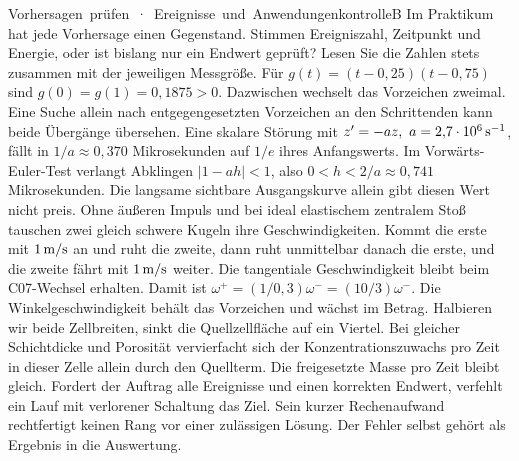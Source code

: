 \unit{Vorhersagen prüfen · Ereignisse und Anwendungen}{kontrolleB}
\begingroup\fontsize{10}{13.0}\selectfont
Im Praktikum hat jede Vorhersage einen Gegenstand. Stimmen Ereigniszahl, Zeitpunkt und Energie, oder ist bislang nur ein Endwert geprüft? Lesen Sie die Zahlen stets zusammen mit der jeweiligen Messgröße.
\hypertarget{antwort7}{}Für \(g(t)=(t-0{,}25)(t-0{,}75)\) sind \(g(0)=g(1)=0{,}1875>0\). Dazwischen wechselt das Vorzeichen zweimal. Eine Suche allein nach entgegengesetzten Vorzeichen an den Schrittenden kann beide Übergänge übersehen.
\hypertarget{antwort8}{}Eine skalare Störung mit \(z'=-az,\ a=2{,}7\cdot10^6\,\mathrm{s^{-1}}\), fällt in \(1/a\approx0{,}370\) Mikrosekunden auf \(1/e\) ihres Anfangswerts. Im Vorwärts-Euler-Test verlangt Abklingen \(|1-ah|<1\), also \(0<h<2/a\approx0{,}741\) Mikrosekunden. Die langsame sichtbare Ausgangskurve allein gibt diesen Wert nicht preis.
\hypertarget{antwort9}{}Ohne äußeren Impuls und bei ideal elastischem zentralem Stoß tauschen zwei gleich schwere Kugeln ihre Geschwindigkeiten. Kommt die erste mit \(1\,\mathrm{m/s}\) an und ruht die zweite, dann ruht unmittelbar danach die erste, und die zweite fährt mit \(1\,\mathrm{m/s}\) weiter.
\hypertarget{antwort10}{}Die tangentiale Geschwindigkeit bleibt beim C07-Wechsel erhalten. Damit ist \(\omega^+=(1/0{,}3)\omega^-=(10/3)\omega^-\). Die Winkelgeschwindigkeit behält das Vorzeichen und wächst im Betrag.
\hypertarget{antwort11}{}Halbieren wir beide Zellbreiten, sinkt die Quellzellfläche auf ein Viertel. Bei gleicher Schichtdicke und Porosität vervierfacht sich der Konzentrationszuwachs pro Zeit in dieser Zelle allein durch den Quellterm. Die freigesetzte Masse pro Zeit bleibt gleich.
\hypertarget{antwort12}{}Fordert der Auftrag alle Ereignisse und einen korrekten Endwert, verfehlt ein Lauf mit verlorener Schaltung das Ziel. Sein kurzer Rechenaufwand rechtfertigt keinen Rang vor einer zulässigen Lösung. Der Fehler selbst gehört als Ergebnis in die Auswertung.
\endgroup

